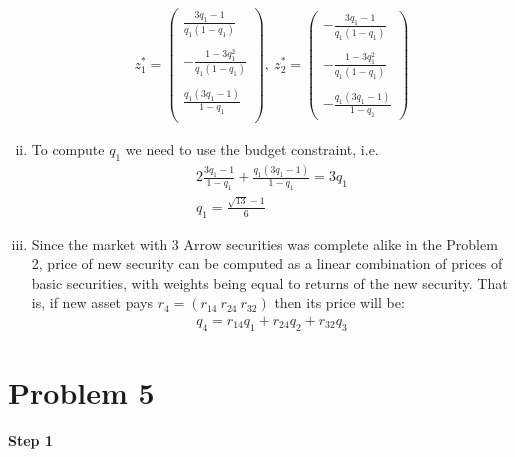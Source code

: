\documentclass[a4paper]{article}
\begin{document}
\begin{enumerate}[(i)]
	\begin{align*}
	z_1^* = \begin{pmatrix}
	\frac{3q_1 - 1}{q_1(1 - q_1)}\\
	\\
	-\frac{1 - 3q_1^2}{q_1(1 - q_1)}\\
	\\
	\frac{q_1(3q_1 - 1)}{1 - q_1}\\
	\end{pmatrix},\ z_2^* = \begin{pmatrix}
	-\frac{3q_1 - 1}{q_1(1 - q_1)}\\
	\\
	-\frac{1 - 3q_1^2}{q_1(1 - q_1)}\\
	\\
	-\frac{q_1(3q_1 - 1)}{1 - q_1}	
	\end{pmatrix}
	\end{align*}
	\item To compute $q_1$ we need to use the budget constraint, i.e.
	\begin{align*}
	2\frac{3q_1 - 1}{1-q_1} + \frac{q_1(3q_1 - 1)}{1 - q_1} = 3q_1\\
	q_1 = \frac{\sqrt{13} - 1}{6}
	\end{align*}
	\item Since the market with 3 Arrow securities was complete alike in the Problem 2, price of new security can be computed as a linear combination of prices of basic securities, with weights being equal to returns of the new security. That is, if new asset pays $r_4 = (r_{14}\ r_{24}\ r_{32})$ then its price will be:
	\begin{align*}
	q_4 = r_{14}q_1 + r_{24}q_2+ r_{32}q_3
	\end{align*}
\end{enumerate}
\section*{Problem 5}
\textbf{Step 1}
\end{document}
